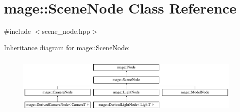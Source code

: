 \hypertarget{classmage_1_1_scene_node}{}\section{mage\+:\+:Scene\+Node Class Reference}
\label{classmage_1_1_scene_node}


{\ttfamily \#include $<$scene\+\_\+node.\+hpp$>$}

Inheritance diagram for mage\+:\+:Scene\+Node\+:\begin{figure}[H]
\begin{center}
\leavevmode
\includegraphics[height=2.986667cm]{classmage_1_1_scene_node}
\end{center}
\end{figure}
